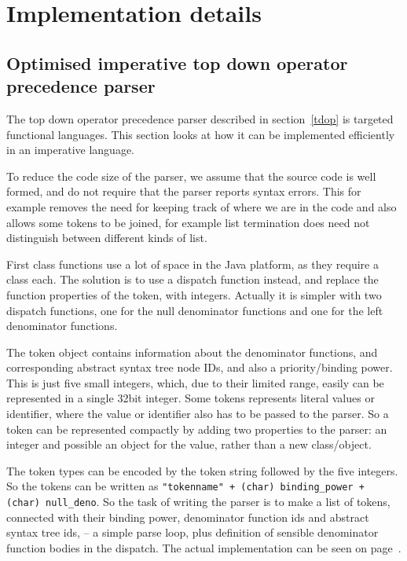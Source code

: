 \documentclass[11pt]{report}
\begin{document}
\section{Implementation details}
\subsection{Optimised imperative top down operator precedence parser}
The top down operator precedence parser described in section~\ref{tdop} is targeted functional languages.
This section looks at how it can be implemented efficiently in an imperative language.

To reduce the code size of the parser, we assume that the source code is well formed, and do not require that the parser reports syntax errors. This for example removes the need for keeping track of where we are in the code and also allows some tokens to be joined, for example list termination does need not distinguish between different kinds of list.

First class functions use a lot of space in the Java platform, as they require a class each.
The solution is to use a dispatch function instead, and replace the function properties of the token, with integers.
Actually it is simpler with two dispatch functions, one for the null denominator functions and one for the left denominator functions.

The token object contains information about the denominator functions, and corresponding abstract syntax tree node IDs, and also a priority/binding power.
This is just five small integers, which, due to their limited range, easily can be represented in a single 32bit integer. 
Some tokens represents literal values or identifier, where the value or identifier also has to be passed to the parser.
So a token can be represented compactly by adding two properties to the parser: an integer and possible an object for the value, rather than a new class/object.

The token types can be encoded by the token string followed by the five integers.
So the tokens can be written as {\tt "tokenname" + (char) binding\_power + 
(char) null\_deno}. 
So the task of writing the parser is to make a list of tokens, connected with their binding power, denominator function ids and abstract syntax tree ids, -- a simple parse loop, plus definition of sensible denominator function bodies in the dispatch.
The actual implementation can be seen on page~\pageref{code-lightscript-parser}.
\end{document}
